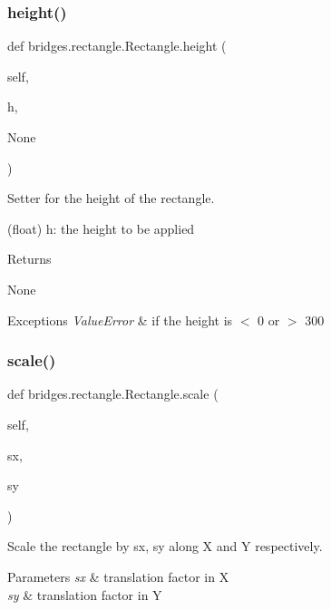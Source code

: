 \subsubsection{\texorpdfstring{height()}{height()}\hspace{0.1cm}{\footnotesize\ttfamily [2/2]}}
{\footnotesize\ttfamily def bridges.\+rectangle.\+Rectangle.\+height (\begin{DoxyParamCaption}\item[{}]{self,  }\item[{}]{h,  }\item[{}]{None }\end{DoxyParamCaption})}



Setter for the height of the rectangle. 

(float) h\+: the height to be applied \begin{DoxyReturn}{Returns}


None
\end{DoxyReturn}

\begin{DoxyExceptions}{Exceptions}
{\em Value\+Error} & if the height is $<$ 0 or $>$ 300 \\
\hline
\end{DoxyExceptions}
\mbox{\label{classbridges_1_1rectangle_1_1_rectangle_af540e714f768efb6142310047fffc8c7}} 
\subsubsection{\texorpdfstring{scale()}{scale()}}
{\footnotesize\ttfamily def bridges.\+rectangle.\+Rectangle.\+scale (\begin{DoxyParamCaption}\item[{}]{self,  }\item[{}]{sx,  }\item[{}]{sy }\end{DoxyParamCaption})}



Scale the rectangle by sx, sy along X and Y respectively. 


\begin{DoxyParams}{Parameters}
{\em sx} & translation factor in X \\
\hline
{\em sy} & translation factor in Y \\
\hline
\end{DoxyParams}
\mbox{\label{classbridges_1_1rectangle_1_1_rectangle_a187376dcdc5c10c5b1ce5f3f00a80961}} 
